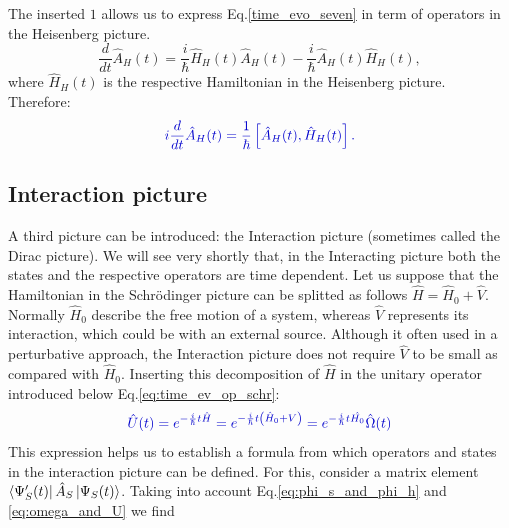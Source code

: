 \documentclass[12pt, titlepage]{article}
\begin{document}
The inserted $ 1 $ allows us to express Eq.\enskip\eqref{time_evo_seven} in term of operators in the Heisenberg picture.
\begin{equation}
\frac{d}{dt}\hat{A}_{H}(t)
	=\frac{i}{\hbar}
	\hat{H}_{H}(t)\hat{A}_{H}(t)
	-
	\frac{i}{\hbar}
	\hat{A}_{H}(t)\hat{H}_{H}(t),
\end{equation} 
where $ \hat{H}_{H}(t) $ is the respective Hamiltonian in the Heisenberg  picture.
Therefore:
\begin{equation}\label{eq:Heisenberg_time_dep._eq.}
\textcolor[RGB]{0,0,204}{
i\frac{d}{d t}\hat{A}_{H}(t)=
\frac{1}{\hbar}\left[ \hat{A}_{H}(t),\hat{H}_{H}(t)\right] 
.
}
\end{equation} 
\subsection{Interaction picture}
A third picture can be introduced: the Interaction picture (sometimes called the Dirac picture). We will see very shortly that, in the Interacting picture both the states and the respective operators are time dependent.
Let us suppose that the Hamiltonian in the Schrödinger picture can be splitted as follows $ \hat{H} = \hat{H}_{0}+\hat{V} $. Normally $ \hat{H}_{0} $ describe the free motion of a system, whereas  $ \hat{V} $ represents its interaction, which could be with an external source. Although it often used in a perturbative approach, the Interaction picture does not require $ \hat{V} $  to be small as compared with $ \hat{H}_{0} $. 
Inserting this decomposition of $ \hat{H} $ in the unitary operator introduced below Eq.\enskip\eqref{eq:time_ev_op_schr}:
\begin{equation}\label{eq:omega_and_U}
\textcolor[RGB]{0,0,204}{
\hat{U}(t)=e^{-\frac{i}{\hbar}t \hat{H}}
=e^{-\frac{i}{\hbar}t\left(  \hat{H}_{0}+V\right) }
=
e^{-\frac{i}{\hbar}t \hat{H_{0}}}
\hat{\Omega} (t)
}
\end{equation}
This expression helps us to establish a formula from which operators and states in the interaction picture can be defined. For this, consider a matrix element $ 	\bra{\Psi_{S}^{\prime}(t)}
	\hat{A}_{S}
	\ket{\Psi_{S}(t)} $. Taking into account Eq.\enskip\eqref{eq:phi_s_and_phi_h} and \eqref{eq:omega_and_U} we find
\end{document}
